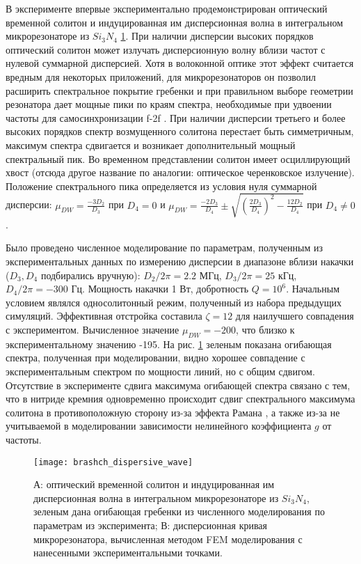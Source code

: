 В эксперименте \cite{Brasch2016} впервые экспериментально продемонстрирован оптический временной солитон и индуцированная им дисперсионная волна в интегральном микрорезонаторе из $Si_3N_4$ \ref{brashch_dispersive_wave}. При наличии дисперсии высоких порядков оптический солитон может излучать дисперсионную волну \cite{PhysRevA.51.2602} вблизи частот с нулевой суммарной дисперсией. Хотя в волоконной оптике этот эффект считается вредным для некоторых приложений, для микрорезонаторов он позволил расширить спектральное покрытие гребенки и при правильном выборе геометрии резонатора дает мощные пики по краям спектра, необходимые при удвоении частоты для самосинхронизации f-2f \cite{Spencer2018}. При наличии дисперсии третьего и более высоких порядков спектр возмущенного солитона перестает быть симметричным, максимум спектра сдвигается и возникает дополнительный мощный спектральный пик. Во временном представлении солитон имеет осциллирующий хвост (отсюда другое название по аналогии: оптическое черенковское излучение). Положение спектрального пика определяется из условия нуля суммарной дисперсии: $\mu_{DW}=\frac{-3D_2}{D_3}$ при $D_4=0$ и $\mu_{DW}=\frac{-2D_3}{D_4}\pm\sqrt{(\frac{2D_3}{D_4})^2-\frac{12D_2}{D_4}}$ при $D_4\neq0$.

Было проведено численное моделирование по параметрам, полученным из экспериментальных данных по измерению дисперсии в диапазоне вблизи накачки ($D_3,D_4$ подбирались вручную): $D_2/2\pi=2.2$ МГц, $D_3/2\pi=25$ кГц, $D_4/2\pi=-300$ Гц. Мощность накачки 1 Вт, добротность $Q=10^6$. Начальным условием являлся односолитонный режим, полученный из набора предыдущих симуляций. Эффективная отстройка составила $\zeta=12$ для наилучшего совпадения с экспериментом.  Вычисленное значение $\mu_{DW}=-200$, что близко к экспериментальному значению -195. На рис. \ref{brashch_dispersive_wave} зеленым показана огибающая спектра, полученная при моделировании, видно хорошее совпадение с экспериментальным спектром по мощности линий, но с общим сдвигом. Отсутствие в эксперименте сдвига максимума огибающей спектра связано с тем, что в нитриде кремния одновременно происходит сдвиг спектрального максимума солитона в противоположную сторону из-за эффекта Рамана \cite{Karpov2016}, а также из-за не учитываемой в моделировании зависимости нелинейного коэффициента $g$ от частоты.

\begin{figure}
  \centering
  \texttt{[image: brashch\_dispersive\_wave]}

  \caption{А: оптический временной солитон и индуцированная им дисперсионная волна в интегральном микрорезонаторе из $Si_3N_4$, зеленым дана огибающая гребенки из численного моделирования по параметрам из эксперимента; В: дисперсионная кривая микрорезонатора, вычисленная методом FEM моделирования с нанесенными экспериментальными точками.} \label{brashch_dispersive_wave}
\end{figure}


